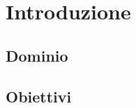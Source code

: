 \setcounter{chapter}{0}

\part{Introduzione}
\label{part:introduzione}

\chapter{Dominio}

\chapter{Obiettivi}
